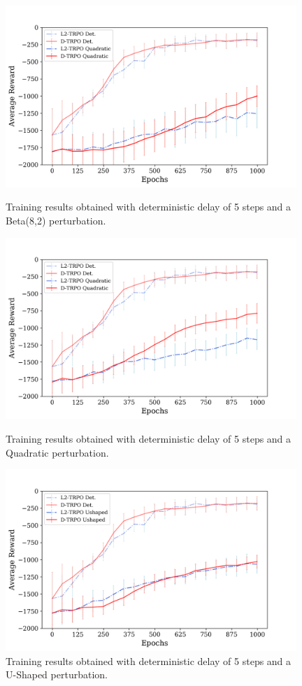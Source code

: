             \begin{figure}[hbtp]
                \centering
                \includegraphics[width=11cm, keepaspectratio]{images/results/noises_beta_comparison_1.png}
                \caption{Training results obtained with deterministic delay of 5 steps and a Beta(8,2) perturbation.}
                \label{fig:results_beta_1}
                
                \includegraphics[width=11cm, keepaspectratio]{images/results/noises_quad_comparison_1.png}
                \caption{Training results obtained with deterministic delay of 5 steps and a Quadratic perturbation.}
                \label{fig:results_quad_1}
                
                \includegraphics[width=11cm, keepaspectratio]{images/results/noises_ush_comparison_1.png}
                \caption{Training results obtained with deterministic delay of 5 steps and a U-Shaped perturbation.}
                \label{fig:results_ush_1}
            \end{figure}
            

